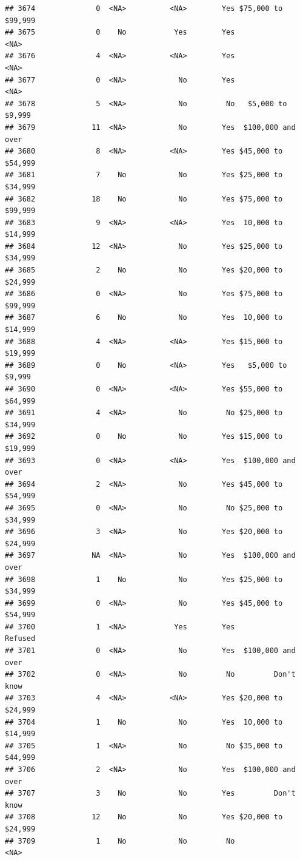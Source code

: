 \documentclass[man]{apa6}
\begin{document}
\begin{verbatim}
## 3674              0  <NA>          <NA>        Yes $75,000 to $99,999
## 3675              0    No           Yes        Yes               <NA>
## 3676              4  <NA>          <NA>        Yes               <NA>
## 3677              0  <NA>            No        Yes               <NA>
## 3678              5  <NA>            No         No   $5,000 to $9,999
## 3679             11  <NA>            No        Yes  $100,000 and over
## 3680              8  <NA>          <NA>        Yes $45,000 to $54,999
## 3681              7    No            No        Yes $25,000 to $34,999
## 3682             18    No            No        Yes $75,000 to $99,999
## 3683              9  <NA>          <NA>        Yes  10,000 to $14,999
## 3684             12  <NA>            No        Yes $25,000 to $34,999
## 3685              2    No            No        Yes $20,000 to $24,999
## 3686              0  <NA>            No        Yes $75,000 to $99,999
## 3687              6    No            No        Yes  10,000 to $14,999
## 3688              4  <NA>          <NA>        Yes $15,000 to $19,999
## 3689              0    No          <NA>        Yes   $5,000 to $9,999
## 3690              0  <NA>          <NA>        Yes $55,000 to $64,999
## 3691              4  <NA>            No         No $25,000 to $34,999
## 3692              0    No            No        Yes $15,000 to $19,999
## 3693              0  <NA>          <NA>        Yes  $100,000 and over
## 3694              2  <NA>            No        Yes $45,000 to $54,999
## 3695              0  <NA>            No         No $25,000 to $34,999
## 3696              3  <NA>            No        Yes $20,000 to $24,999
## 3697             NA  <NA>            No        Yes  $100,000 and over
## 3698              1    No            No        Yes $25,000 to $34,999
## 3699              0  <NA>            No        Yes $45,000 to $54,999
## 3700              1  <NA>           Yes        Yes            Refused
## 3701              0  <NA>            No        Yes  $100,000 and over
## 3702              0  <NA>            No         No         Don't know
## 3703              4  <NA>          <NA>        Yes $20,000 to $24,999
## 3704              1    No            No        Yes  10,000 to $14,999
## 3705              1  <NA>            No         No $35,000 to $44,999
## 3706              2  <NA>            No        Yes  $100,000 and over
## 3707              3    No            No        Yes         Don't know
## 3708             12    No            No        Yes $20,000 to $24,999
## 3709              1    No            No         No               <NA>

\end{verbatim}
\end{document}
